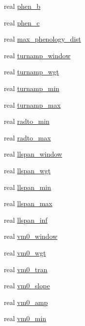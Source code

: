 \begin{DoxyCompactItemize}
real \hyperlink{namespacephenology__coms_add9263a2bb7374fee2ecef8d4ec4f53c}{phen\+\_\+b}
\item 
real \hyperlink{namespacephenology__coms_a8aee741f7b4cfd7e550ca881a5b4e7fc}{phen\+\_\+c}
\item 
real \hyperlink{namespacephenology__coms_a4a4912109f533ba9809ceef7779a7f8f}{max\+\_\+phenology\+\_\+dist}
\item 
real \hyperlink{namespacephenology__coms_aecd43b018bd6d97e1f0cd1035425ef70}{turnamp\+\_\+window}
\item 
real \hyperlink{namespacephenology__coms_a74da3350aa535ec8435c893d39cf6d3e}{turnamp\+\_\+wgt}
\item 
real \hyperlink{namespacephenology__coms_a297e142977c3850943f8004c4b2e628a}{turnamp\+\_\+min}
\item 
real \hyperlink{namespacephenology__coms_acc24a16f84bb52f7afcd9bd34d0ea4b1}{turnamp\+\_\+max}
\item 
real \hyperlink{namespacephenology__coms_a25085ef20a0cb8bb667f6e76ddf4445d}{radto\+\_\+min}
\item 
real \hyperlink{namespacephenology__coms_a7c53ccd64544ccd13e9bd239afd17efb}{radto\+\_\+max}
\item 
real \hyperlink{namespacephenology__coms_a0f473ccc54ccda95e91258f1fa8ca7f5}{llspan\+\_\+window}
\item 
real \hyperlink{namespacephenology__coms_a2c1ffd80335f4c1fc91d2c191ef3ac54}{llspan\+\_\+wgt}
\item 
real \hyperlink{namespacephenology__coms_a716e4a155d793c6a9c915a89152bc4d5}{llspan\+\_\+min}
\item 
real \hyperlink{namespacephenology__coms_a382ead59b03576ca7a302bbf12b8209c}{llspan\+\_\+max}
\item 
real \hyperlink{namespacephenology__coms_ae7c68f51eddeab6a2c016f296c4aeaba}{llspan\+\_\+inf}
\item 
real \hyperlink{namespacephenology__coms_a3b059a9f40578445e857c7fcfc27b249}{vm0\+\_\+window}
\item 
real \hyperlink{namespacephenology__coms_ac445b422671842a19092485ee7b6ea62}{vm0\+\_\+wgt}
\item 
real \hyperlink{namespacephenology__coms_af787e4d677bce2e896156b099a081662}{vm0\+\_\+tran}
\item 
real \hyperlink{namespacephenology__coms_a6eb68bfc2f600cc011376c42a6d005a8}{vm0\+\_\+slope}
\item 
real \hyperlink{namespacephenology__coms_a6f4263a7594e8eec3ea9d87a813fcab4}{vm0\+\_\+amp}
\item 
real \hyperlink{namespacephenology__coms_aa38ce138ee3ecc2631538336aad47054}{vm0\+\_\+min}
\end{DoxyCompactItemize}


